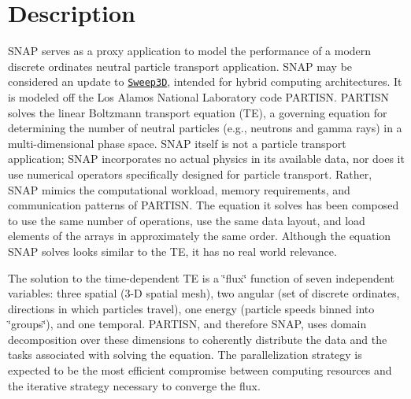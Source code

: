 \section*{Description}

S\-N\-A\-P serves as a proxy application to model the performance of a modern discrete ordinates neutral particle transport application. S\-N\-A\-P may be considered an update to \href{http://www.ccs3.lanl.gov/PAL/software.shtml}{\tt Sweep3\-D}, intended for hybrid computing architectures. It is modeled off the Los Alamos National Laboratory code P\-A\-R\-T\-I\-S\-N. P\-A\-R\-T\-I\-S\-N solves the linear Boltzmann transport equation (T\-E), a governing equation for determining the number of neutral particles (e.\-g., neutrons and gamma rays) in a multi-\/dimensional phase space. S\-N\-A\-P itself is not a particle transport application; S\-N\-A\-P incorporates no actual physics in its available data, nor does it use numerical operators specifically designed for particle transport. Rather, S\-N\-A\-P mimics the computational workload, memory requirements, and communication patterns of P\-A\-R\-T\-I\-S\-N. The equation it solves has been composed to use the same number of operations, use the same data layout, and load elements of the arrays in approximately the same order. Although the equation S\-N\-A\-P solves looks similar to the T\-E, it has no real world relevance.

The solution to the time-\/dependent T\-E is a \char`\"{}flux\char`\"{} function of seven independent variables\-: three spatial (3-\/\-D spatial mesh), two angular (set of discrete ordinates, directions in which particles travel), one energy (particle speeds binned into \char`\"{}groups\char`\"{}), and one temporal. P\-A\-R\-T\-I\-S\-N, and therefore S\-N\-A\-P, uses domain decomposition over these dimensions to coherently distribute the data and the tasks associated with solving the equation. The parallelization strategy is expected to be the most efficient compromise between computing resources and the iterative strategy necessary to converge the flux.

